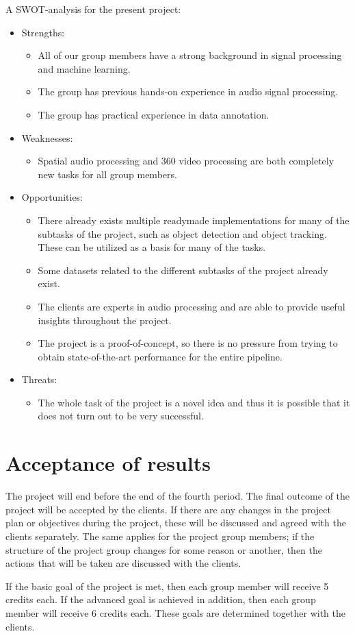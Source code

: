 A SWOT-analysis for the present project:
\begin{itemize}
    \item Strengths:
    \begin{itemize}
        \item All of our group members have a strong background in signal processing and machine learning.
        \item The group has previous hands-on experience in audio signal processing.
        \item The group has practical experience in data annotation.
    \end{itemize}
    \item Weaknesses:
    \begin{itemize}
        \item Spatial audio processing and 360 video processing are both completely new tasks for all group
        members.
    \end{itemize}
    \item Opportunities:
    \begin{itemize}
        \item There already exists multiple readymade implementations for many of the subtasks of the project,
        such as object detection and object tracking. These can be utilized as a basis for many of the tasks.
        \item Some datasets related to the different subtasks of the project already exist.
        \item The clients are experts in audio processing and are able to provide useful insights throughout the
        project.
        \item The project is a proof-of-concept, so there is no pressure from trying to obtain state-of-the-art
        performance for the entire pipeline.
    \end{itemize}
    \item Threats:
    \begin{itemize}
        \item The whole task of the project is a novel idea and thus it is possible that it does not turn out to
        be very successful.
    \end{itemize}
\end{itemize}


\section{Acceptance of results}

The project will end before the end of the fourth period. The final outcome of the project will be accepted by the
clients. If there are any changes in the project plan or objectives during the project, these will be discussed
and agreed with the clients separately. The same applies for the project group members; if the structure of the
project group changes for some reason or another, then the actions that will be taken are discussed with the
clients.

If the basic goal of the project is met, then each group member will receive 5 credits each. If the advanced goal
is achieved in addition, then each group member will receive 6 credits each. These goals are determined together
with the clients.
